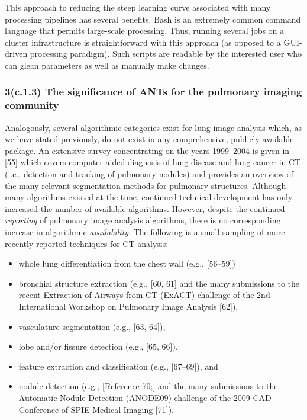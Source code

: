 \documentclass[11pt,]{article}
\begin{document}
This approach to reducing the steep learning curve associated with many
processing pipelines has several benefits. Bash is an extremely common
command language that permits large-scale processing. Thus, running
several jobs on a cluster infrastructure is straightforward with this
approach (as opposed to a GUI-driven processing paradigm). Such scripts
are readable by the interested user who can glean parameters as well as
manually make changes.

\subsubsection{3(c.1.3) The significance of ANTs for the pulmonary
imaging
community}\label{c.1.3-the-significance-of-ants-for-the-pulmonary-imaging-community}

Analogously, several algorithmic categories exist for lung image
analysis which, as we have stated previously, do not exist in any
comprehensive, publicly available package. An extensive survey
concentrating on the years 1999--2004 is given in {[}55{]} which covers
computer aided diagnosis of lung disease and lung cancer in CT (i.e.,
detection and tracking of pulmonary nodules) and provides an overview of
the many relevant segmentation methods for pulmonary structures.
Although many algorithms existed at the time, continued technical
development has only increased the number of available algorithms.
However, despite the continued \emph{reporting} of pulmonary image
analysis algorithms, there is no corresponding increase in algorithmic
\emph{availability}. The following is a small sampling of more recently
reported techniques for CT analysis:

\begin{itemize}
\itemsep1pt\parskip0pt
\item
  whole lung differentiation from the chest wall (e.g., {[}56--59{]})
\item
  bronchial structure extraction (e.g., {[}60, 61{]} and the many
  submissions to the recent Extraction of Airways from CT (ExACT)
  challenge of the 2nd International Workshop on Pulmonary Image
  Analysis {[}62{]}),
\item
  vasculature segmentation (e.g., {[}63, 64{]}),
\item
  lobe and/or fissure detection (e.g., {[}65, 66{]}),
\item
  feature extraction and classification (e.g., {[}67--69{]}), and
\item
  nodule detection (e.g., {[}Reference 70;{]} and the many submissions
  to the Automatic Nodule Detection (ANODE09) challenge of the 2009 CAD
  Conference of SPIE Medical Imaging {[}71{]}).
\end{itemize}
\end{document}
